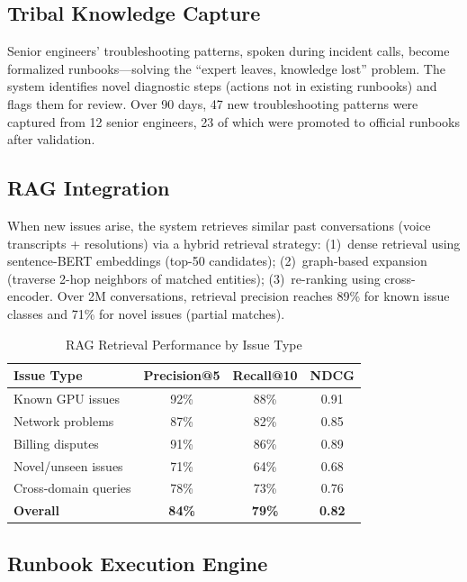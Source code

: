 \documentclass[conference,10pt]{IEEEtran}
\begin{document}
\subsection{Tribal Knowledge Capture}

Senior engineers' troubleshooting patterns, spoken during incident calls, become formalized runbooks---solving the ``expert leaves, knowledge lost'' problem. The system identifies novel diagnostic steps (actions not in existing runbooks) and flags them for review. Over 90 days, 47 new troubleshooting patterns were captured from 12 senior engineers, 23 of which were promoted to official runbooks after validation.

\subsection{RAG Integration}

When new issues arise, the system retrieves similar past conversations (voice transcripts + resolutions) via a hybrid retrieval strategy: (1)~dense retrieval using sentence-BERT embeddings (top-50 candidates); (2)~graph-based expansion (traverse 2-hop neighbors of matched entities); (3)~re-ranking using cross-encoder. Over 2M conversations, retrieval precision reaches 89\% for known issue classes and 71\% for novel issues (partial matches).

\begin{table}[!htbp]
\caption{RAG Retrieval Performance by Issue Type}
\label{tab:rag}
\centering\scriptsize
\begin{tabular}{@{}lccc@{}}
\toprule
\textbf{Issue Type} & \textbf{Precision@5} & \textbf{Recall@10} & \textbf{NDCG} \\
\midrule
Known GPU issues & 92\% & 88\% & 0.91 \\
Network problems & 87\% & 82\% & 0.85 \\
Billing disputes & 91\% & 86\% & 0.89 \\
Novel/unseen issues & 71\% & 64\% & 0.68 \\
Cross-domain queries & 78\% & 73\% & 0.76 \\
\midrule
\textbf{Overall} & \textbf{84\%} & \textbf{79\%} & \textbf{0.82} \\
\bottomrule
\end{tabular}
\end{table}




\subsection{Runbook Execution Engine}
\end{document}
